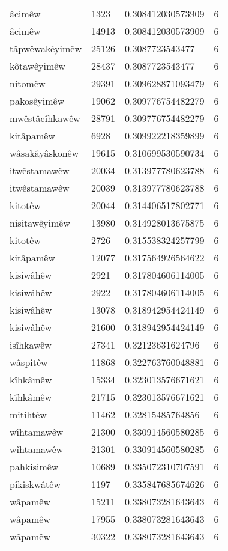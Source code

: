 \begin{longtable}{llll}
âcimêw & 1323 & 0.308412030573909 & 6\\
âcimêw & 14913 & 0.308412030573909 & 6\\
tâpwêwakêyimêw & 25126 & 0.3087723543477 & 6\\
kôtawêyimêw & 28437 & 0.3087723543477 & 6\\
nitomêw & 29391 & 0.309628871093479 & 6\\
pakosêyimêw & 19062 & 0.309776754482279 & 6\\
mwêstâcîhkawêw & 28791 & 0.309776754482279 & 6\\
kitâpamêw & 6928 & 0.309922218359899 & 6\\
wâsakâyâskonêw & 19615 & 0.310699530590734 & 6\\
itwêstamawêw & 20034 & 0.313977780623788 & 6\\
itwêstamawêw & 20039 & 0.313977780623788 & 6\\
kitotêw & 20044 & 0.314406517802771 & 6\\
nisitawêyimêw & 13980 & 0.314928013675875 & 6\\
kitotêw & 2726 & 0.315538324257799 & 6\\
kitâpamêw & 12077 & 0.317564926564622 & 6\\
kisiwâhêw & 2921 & 0.317804606114005 & 6\\
kisiwâhêw & 2922 & 0.317804606114005 & 6\\
kisiwâhêw & 13078 & 0.318942954424149 & 6\\
kisiwâhêw & 21600 & 0.318942954424149 & 6\\
isîhkawêw & 27341 & 0.32123631624796 & 6\\
wâspitêw & 11868 & 0.322763760048881 & 6\\
kîhkâmêw & 15334 & 0.323013576671621 & 6\\
kîhkâmêw & 21715 & 0.323013576671621 & 6\\
mitihtêw & 11462 & 0.32815485764856 & 6\\
wîhtamawêw & 21300 & 0.330914560580285 & 6\\
wîhtamawêw & 21301 & 0.330914560580285 & 6\\
pahkisimêw & 10689 & 0.335072310707591 & 6\\
pîkiskwâtêw & 1197 & 0.335847685674626 & 6\\
wâpamêw & 15211 & 0.338073281643643 & 6\\
wâpamêw & 17955 & 0.338073281643643 & 6\\
wâpamêw & 30322 & 0.338073281643643 & 6\\

\end{longtable}
